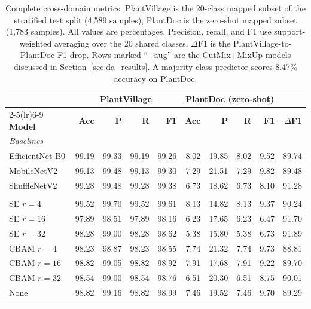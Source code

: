 \documentclass[preprint,12pt]{elsarticle}
\begin{document}
\begin{table}[t]
\centering
\footnotesize
\setlength{\tabcolsep}{3.5pt}
\caption{Complete cross-domain metrics. PlantVillage is the 20-class mapped subset of the stratified test split (4,589 samples); PlantDoc is the zero-shot mapped subset (1,783 samples). All values are percentages. Precision, recall, and F1 use support-weighted averaging over the 20 shared classes. $\Delta$F1 is the PlantVillage-to-PlantDoc F1 drop. Rows marked ``+aug'' are the CutMix+MixUp models discussed in Section~\ref{sec:da_results}. A majority-class predictor scores 8.47\% accuracy on PlantDoc.}
\label{tab:all_metrics}
\begin{tabular}{l rrrr rrrrr}
\toprule
& \multicolumn{4}{c}{\textbf{PlantVillage}} & \multicolumn{4}{c}{\textbf{PlantDoc (zero-shot)}} & \\
\cmidrule(lr){2-5}\cmidrule(lr){6-9}
\textbf{Model} & \textbf{Acc} & \textbf{P} & \textbf{R} & \textbf{F1} & \textbf{Acc} & \textbf{P} & \textbf{R} & \textbf{F1} & \textbf{$\Delta$F1} \\
\midrule
\multicolumn{10}{l}{\textit{Baselines}} \\
EfficientNet-B0 & 99.19 & 99.33 & 99.19 & 99.26 & 8.02 & 19.85 & 8.02 & 9.52 & 89.74 \\
MobileNetV2 & 99.13 & 99.48 & 99.13 & 99.30 & 7.29 & 21.51 & 7.29 & 9.82 & 89.48 \\
ShuffleNetV2 & 99.28 & 99.48 & 99.28 & 99.38 & 6.73 & 18.62 & 6.73 & 8.10 & 91.28 \\
\addlinespace
\multicolumn{10}{l}{\textit{MobileNetV3 Large}} \\
SE $r=4$ & 99.52 & 99.70 & 99.52 & 99.61 & 8.13 & 14.82 & 8.13 & 9.37 & 90.24 \\
SE $r=16$ & 97.89 & 98.51 & 97.89 & 98.16 & 6.23 & 17.65 & 6.23 & 6.47 & 91.70 \\
SE $r=32$ & 98.28 & 99.00 & 98.28 & 98.62 & 5.38 & 15.80 & 5.38 & 6.73 & 91.89 \\
CBAM $r=4$ & 98.23 & 98.87 & 98.23 & 98.55 & 7.74 & 21.32 & 7.74 & 9.73 & 88.81 \\
CBAM $r=16$ & 98.82 & 99.05 & 98.82 & 98.92 & 7.91 & 17.68 & 7.91 & 9.22 & 89.70 \\
CBAM $r=32$ & 98.54 & 99.00 & 98.54 & 98.76 & 6.51 & 20.30 & 6.51 & 8.75 & 90.01 \\
None & 98.82 & 99.16 & 98.82 & 98.99 & 7.46 & 19.52 & 7.46 & 9.70 & 89.29 \\
\addlinespace
\multicolumn{10}{l}{\textit{MobileNetV3 Small}} \\

\end{tabular}
\end{table}
\end{document}
